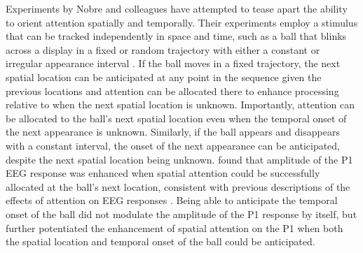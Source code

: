 \documentclass[dwyatte_dissertation.tex]{subfiles}
\begin{document}
{%
Experiments by Nobre and colleagues have attempted to tease apart the ability to orient attention spatially and temporally. Their experiments employ a stimulus that can be tracked independently in space and time, such as a ball that blinks across a display in a fixed or random trajectory with either a constant or irregular appearance interval \cite{DohertyRaoMesulamEtAl05,RohenkohlNobre11}. If the ball moves in a fixed trajectory, the next spatial location can be anticipated at any point in the sequence given the previous locations and attention can be allocated there to enhance processing relative to when the next spatial location is unknown. Importantly, attention can be allocated to the ball's next spatial location even when the temporal onset of the next appearance is unknown. Similarly, if the ball appears and disappears with a constant interval, the onset of the next appearance can be anticipated, despite the next spatial location being unknown.  found that amplitude of the P1 EEG response was enhanced when spatial attention could be successfully allocated at the ball's next location, consistent with previous descriptions of the effects of attention on EEG responses \cite{LuckHeinzeMangunEtAl90}. Being able to anticipate the temporal onset of the ball did not modulate the amplitude of the P1 response by itself, but further potentiated the enhancement of spatial attention on the P1 when both the spatial location and temporal onset of the ball could be anticipated.








}
\end{document}

